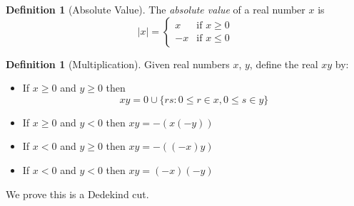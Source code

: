 \documentclass{article}
\theoremstyle{definition}
\newtheorem{definition}[axiom]{Definition}
\begin{document}
    \begin{definition}[Absolute Value]
        The \emph{absolute value} of a real number $x$ is
        \[ |x| = \begin{cases}
            x & \text{if } x \geq 0 \\
            -x & \text{if } x \leq 0
        \end{cases} \]
    \end{definition}

    \begin{definition}[Multiplication]
        Given real numbers $x$, $y$, define the real $xy$ by:
        \begin{itemize}
            \item If $x \geq 0$ and $y \geq 0$ then
            \[ xy = 0 \cup \{ rs : 0 \leq r \in x, 0 \leq s \in y \} \]
            \item If $x \geq 0$ and $y < 0$ then $xy = -(x(-y))$
            \item If $x < 0$ and $y \geq 0$ then $xy = -((-x)y)$
            \item If $x < 0$ and $y < 0$ then $xy = (-x)(-y)$
        \end{itemize}

        We prove this is a Dedekind cut.
    \end{definition}
\end{document}
